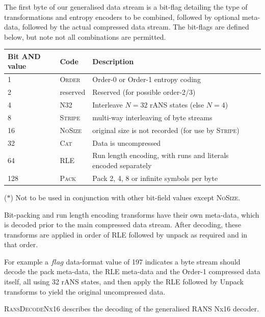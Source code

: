 \documentclass[a4paper]{article}
\begin{document}
The first byte of our generalised data stream is a bit-flag detailing the type of transformations and entropy encoders to be combined, followed by optional meta-data, followed by the actual compressed data stream.
The bit-flags are defined below, but note not all combinations are permitted.

\begin{threeparttable}[t]
\begin{tabular}{llll}
\hline
\textbf{Bit AND value} & \textbf{Code} & \textbf{Description} \\
\hline
1 & \textsc{Order} & Order-0 or Order-1 entropy coding\\
2 & reserved & Reserved (for possible order-2/3)\\
4 & \textsc{N32} & Interleave $N=32$ rANS states (else $N=4$)\\
8 & \textsc{Stripe}\tnote{\textbf{$*$}} & multi-way interleaving of byte streams\\
16 & \textsc{NoSize} & original size is not recorded (for use by \textsc{Stripe})\\
32 & \textsc{Cat} & Data is uncompressed\\
64 & \textsc{RLE} & Run length encoding, with runs and literals encoded separately\\
128 & \textsc{Pack} & Pack 2, 4, 8 or infinite symbols per byte\\
\hline
\end{tabular}
\begin{tablenotes}
\item{\footnotesize{($*$)}} \footnotesize{Not to be used in conjunction with other bit-field values except \textsc{NoSize}.}
\end{tablenotes}
\end{threeparttable}

Bit-packing and run length encoding transforms have their own
meta-data, which is decoded prior to the main compressed data stream.
After decoding, these transforms are applied in order of RLE followed
by unpack as required and in that order.

For example a $flag$ data-format value of 197 indicates a byte stream
should decode the pack meta-data, the RLE meta-data and the Order-1 compressed
data itself, all using 32 rANS states, and then apply the RLE followed
by Unpack transforms to yield the original uncompressed data.

\textsc{RansDecodeNx16} describes the decoding of the generalised RANS Nx16 decoder.
\end{document}

